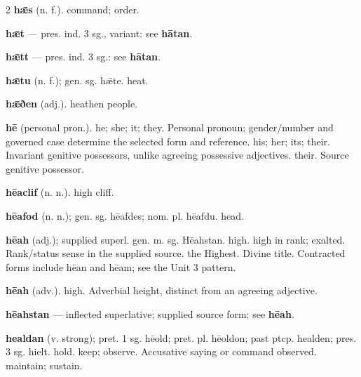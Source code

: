 \begin{multicols*}{2}
\textbf{hǣs} (n. f.). command; order.\par
\textbf{hǣt} — pres. ind. 3 sg., variant: see \textbf{hātan}.\par
\textbf{hǣtt} — pres. ind. 3 sg.: see \textbf{hātan}.\par
\textbf{hǣtu} (n. f.); gen. sg. hǣte. heat.\par
\textbf{hǣðen} (adj.). heathen people.\par
\textbf{hē} (personal pron.). he; she; it; they. Personal pronoun; gender/number and governed case determine the selected form and reference. his; her; its; their. Invariant genitive possessors, unlike agreeing possessive adjectives. their. Source genitive possessor.\par
\textbf{hēaclif} (n. n.). high cliff.\par
\textbf{hēafod} (n. n.); gen. sg. hēafdes; nom. pl. hēafdu. head.\par
\textbf{hēah} (adj.); supplied superl. gen. m. sg. Hēahstan. high. high in rank; exalted. Rank/status sense in the supplied source. the Highest. Divine title. Contracted forms include hēan and hēam; see the Unit 3 pattern.\par
\textbf{hēah} (adv.). high. Adverbial height, distinct from an agreeing adjective.\par
\textbf{hēahstan} — inflected superlative; supplied source form: see \textbf{hēah}.\par
\textbf{healdan} (v. strong); pret. 1 sg. hēold; pret. pl. hēoldon; past ptcp. healden; pres. 3 sg. hielt. hold. keep; observe. Accusative saying or command observed. maintain; sustain.\par

\end{multicols*}
